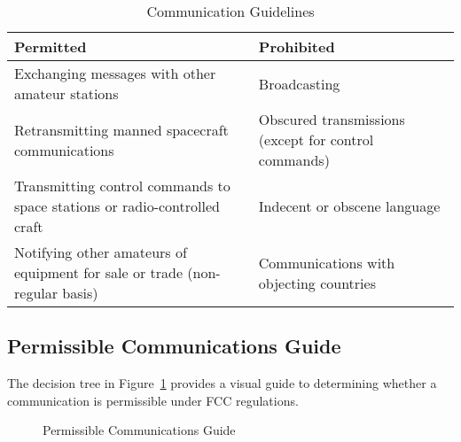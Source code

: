 \begin{table}[h]
    \centering
    \caption{Communication Guidelines}
    \label{tab:comm_guidelines}
    \begin{tabular}{|l|l|}
        \hline
        \textbf{Permitted} & \textbf{Prohibited} \\
        \hline
        Exchanging messages with other amateur stations & Broadcasting \\
        Retransmitting manned spacecraft communications & Obscured transmissions (except for control commands) \\
        Transmitting control commands to space stations or radio-controlled craft & Indecent or obscene language \\
        Notifying other amateurs of equipment for sale or trade (non-regular basis) & Communications with objecting countries \\
        \hline
    \end{tabular}
\end{table}

\subsection*{Permissible Communications Guide}
The decision tree in Figure~\ref{fig:permitted_comms} provides a visual guide to determining whether a communication is permissible under FCC regulations.

\begin{figure}[h]
    \centering
    \caption{Permissible Communications Guide}
    \label{fig:permitted_comms}
\end{figure}

